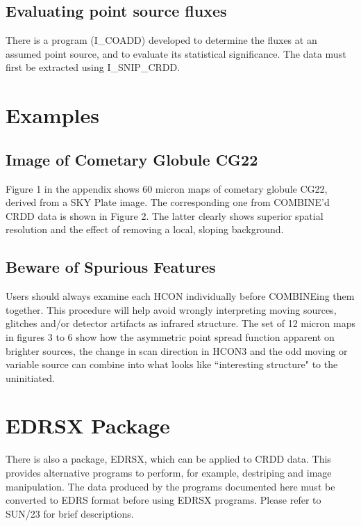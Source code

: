 \subsection{Evaluating point source fluxes}

There is a program (I\_COADD) developed to determine the fluxes at an assumed 
point source, and to evaluate its statistical significance. The data must
first be extracted using I\_SNIP\_CRDD.

\section {Examples}

\subsection {Image of Cometary Globule CG22}

Figure 1 in the appendix shows 60 micron maps of cometary globule CG22, derived
from a SKY Plate image. The corresponding one from COMBINE'd CRDD data is shown 
in Figure 2. The latter clearly shows superior spatial resolution and the
effect of removing a local, sloping background.

\subsection {Beware of Spurious Features}

Users should always examine each HCON individually before COMBINEing them  
together. This procedure will help avoid wrongly interpreting moving sources, 
glitches and/or detector artifacts as infrared structure. The set of 12 micron  
maps in figures 3 to 6 show how the asymmetric point spread function apparent  
on brighter sources, the change in scan direction in HCON3 and the odd moving 
or variable source can combine into what looks like ``interesting structure" to 
the uninitiated.

\section {EDRSX Package}

There is also a package, EDRSX, which can be applied to CRDD data. This provides
alternative programs to perform, for example, destriping and image
manipulation. The data produced by the programs documented here must be
converted to EDRS format before using EDRSX programs. Please refer to SUN/23 for
brief descriptions.


